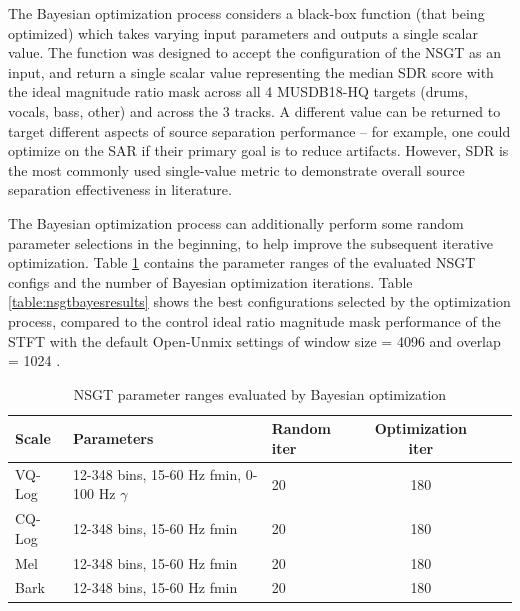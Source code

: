 \documentclass[letter,12pt,notitlepage]{article}
\begin{document}
The Bayesian optimization process considers a black-box function (that being optimized) which takes varying input parameters and outputs a single scalar value. The function was designed to accept the configuration of the NSGT as an input, and return a single scalar value representing the median SDR score with the ideal magnitude ratio mask across all 4 MUSDB18-HQ targets (drums, vocals, bass, other) and across the 3 tracks. A different value can be returned to target different aspects of source separation performance -- for example, one could optimize on the SAR if their primary goal is to reduce artifacts. However, SDR is the most commonly used single-value metric to demonstrate overall source separation effectiveness in literature.

The Bayesian optimization process can additionally perform some random parameter selections in the beginning, to help improve the subsequent iterative optimization. Table \ref{table:nsgtparamsirm} contains the parameter ranges of the evaluated NSGT configs and the number of Bayesian optimization iterations. Table \ref{table:nsgtbayesresults} shows the best configurations selected by the optimization process, compared to the control ideal ratio magnitude mask performance of the STFT with the default Open-Unmix settings of window size = 4096 and overlap = 1024 \cite{umx}.

\begin{table}[ht]
	\centering
\begin{tabular}{ |l|l|l|c|c|c| }
	 \hline
	  Scale & Parameters & Random iter & Optimization iter \\
	 \hline
	 \hline
	 VQ-Log & 12-348 bins, 15-60 Hz fmin, 0-100 Hz $\gamma$ & 20 & 180 \\
	 \hline
	 CQ-Log & 12-348 bins, 15-60 Hz fmin & 20 & 180 \\
	 \hline
	 Mel & 12-348 bins, 15-60 Hz fmin & 20 & 180 \\
	 \hline
	 Bark & 12-348 bins, 15-60 Hz fmin & 20 & 180 \\
	 \hline
\end{tabular}
	\caption{NSGT parameter ranges evaluated by Bayesian optimization}
	\label{table:nsgtparamsirm}
\end{table}
\end{document}
